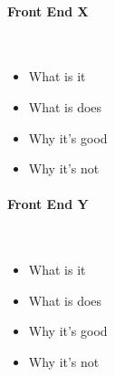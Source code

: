\paragraph{Front End X}\ \\
{\color{red}
	\begin{itemize}
		\item What is it
		\item What is does
		\item Why it's good
		\item Why it's not
	\end{itemize}
}

\paragraph{Front End Y}\ \\
{\color{red}
	\begin{itemize}
		\item What is it
		\item What is does
		\item Why it's good
		\item Why it's not
	\end{itemize}
}
